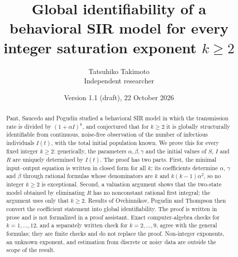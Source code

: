 \documentclass[10pt,a4paper]{article}
\title{Global identifiability of a behavioral SIR model\newline
for every integer saturation exponent $k\geq2$}
\author{Tatsuhiko Takimoto\\\small Independent researcher}
\date{Version 1.1 (draft), 22 October 2026}
\theoremstyle{definition}
\theoremstyle{remark}
\begin{document}
\maketitle
\begin{abstract}
Pant, Saucedo and Pogudin studied a behavioral SIR model in which the
transmission rate is divided by $(1+\alpha I)^k$, and conjectured that for
$k\geq2$ it is globally structurally identifiable from continuous,
noise-free observation of the number of infectious individuals $I(t)$,
with the total initial population known. We prove this for every fixed
integer $k\geq2$: generically, the parameters $\alpha,\beta,\gamma$ and the
initial values of $S$, $I$ and $R$ are uniquely determined by $I(t)$. The
proof has two parts. First, the minimal input--output equation is written
in closed form for all $k$; its coefficients determine $\alpha$, $\gamma$
and $\beta$ through rational formulas whose denominators are $k$ and
$k(k-1)\alpha^2$, so no integer $k\geq2$ is exceptional. Second, a
valuation argument shows that the two-state model obtained by eliminating
$R$ has no nonconstant rational first integral; the argument uses only
that $k\geq2$. Results of Ovchinnikov, Pogudin and Thompson then convert
the coefficient statement into global identifiability. The proof is
written in prose and is not formalized in a proof assistant. Exact
computer-algebra checks for $k=1,\dots,12$, and a separately written
check for $k=2,\dots,9$, agree with the general formulas; they are finite
checks and do not replace the proof. Non-integer exponents, an unknown
exponent, and estimation from discrete or noisy data are outside the
scope of the result.
\end{abstract}
\end{document}
